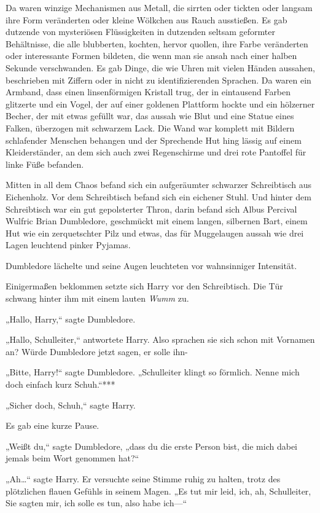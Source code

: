 {Da waren winzige Mechanismen aus Metall, die sirrten oder tickten oder langsam ihre Form veränderten oder kleine Wölkchen aus Rauch ausstießen. Es gab dutzende von mysteriösen Flüssigkeiten in dutzenden seltsam geformter Behältnisse, die alle blubberten, kochten, hervor quollen, ihre Farbe veränderten oder interessante Formen bildeten, die wenn man sie ansah nach einer halben Sekunde verschwanden. Es gab Dinge, die wie Uhren mit vielen Händen aussahen, beschrieben mit Ziffern oder in nicht zu identifizierenden Sprachen. Da waren ein Armband, dass einen linsenförmigen Kristall trug, der in eintausend Farben glitzerte und ein Vogel, der auf einer goldenen Plattform hockte und ein hölzerner Becher, der mit etwas gefüllt war, das aussah wie Blut und eine Statue eines Falken, überzogen mit schwarzem Lack. Die Wand war komplett mit Bildern schlafender Menschen behangen und der Sprechende Hut hing lässig auf einem Kleiderständer, an dem sich auch zwei Regenschirme und drei rote Pantoffel für linke Füße befanden.

Mitten in all dem Chaos befand sich ein aufgeräumter schwarzer Schreibtisch aus Eichenholz. Vor dem Schreibtisch befand sich ein eichener Stuhl. Und hinter dem Schreibtisch war ein gut gepolsterter Thron, darin befand sich Albus Percival Wulfric Brian Dumbledore, geschmückt mit einem langen, silbernen Bart, einem Hut wie ein zerquetschter Pilz und etwas, das für Muggelaugen aussah wie drei Lagen leuchtend pinker Pyjamas.

Dumbledore lächelte und seine Augen leuchteten vor wahnsinniger Intensität.

Einigermaßen beklommen setzte sich Harry vor den Schreibtisch. Die Tür schwang hinter ihm mit einem lauten \emph{Wumm} zu.

„Hallo, Harry,“ sagte Dumbledore.

„Hallo, Schulleiter,“ antwortete Harry. Also sprachen sie sich schon mit Vornamen an? Würde Dumbledore jetzt sagen, er solle ihn-

„Bitte, Harry!“ sagte Dumbledore. „Schulleiter klingt so förmlich. Nenne mich doch einfach kurz Schuh.“***

„Sicher doch, Schuh,“ sagte Harry.

Es gab eine kurze Pause.

„Weißt du,“ sagte Dumbledore, „dass du die erste Person bist, die mich dabei jemals beim Wort genommen hat?“

„Ah…“ sagte Harry. Er versuchte seine Stimme ruhig zu halten, trotz des plötzlichen flauen Gefühls in seinem Magen. „Es tut mir leid, ich, ah, Schulleiter, Sie sagten mir, ich solle es tun, also habe ich—“

}
